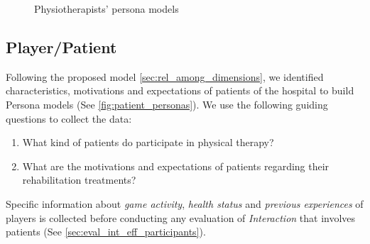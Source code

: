 \begin{figure}[bth]
\centering
\caption{Physiotherapists' persona models}
\label{fig:physio_personas}
\end{figure}

\subsection{Player/Patient}
Following the proposed model \autoref{sec:rel_among_dimensions}, we identified characteristics, motivations and expectations of patients of the hospital to build Persona models (See \autoref{fig:patient_personas}). We use the following guiding questions to collect the data:

\begin{enumerate}
    \item What kind of patients do participate in physical therapy?
    \item What are the motivations and expectations of patients regarding their rehabilitation treatments?
\end{enumerate}

Specific information about \textit{game activity}, \textit{health status} and \textit{previous experiences} of players is collected before conducting any evaluation of \emph{Interaction} that involves patients (See \autoref{sec:eval_int_eff_participants}).

